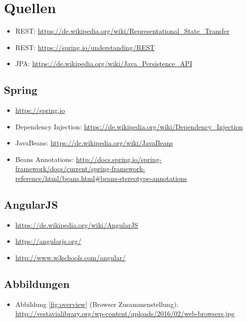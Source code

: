 \section{Quellen}

\begin{itemize}
	\item REST: \url{https://de.wikipedia.org/wiki/Representational_State_Transfer} 
	\item REST: \url{https://spring.io/understanding/REST} 
	\item JPA: \url{https://de.wikipedia.org/wiki/Java_Persistence_API} 
\end{itemize}

\subsection{Spring}

\begin{itemize}
	\item \url{https://spring.io}
	\item Dependency Injection: \url{https://de.wikipedia.org/wiki/Dependency_Injection}
	\item JavaBeans: \url{https://de.wikipedia.org/wiki/JavaBeans}
	\item Beans Annotations: \url{http://docs.spring.io/spring-framework/docs/current/spring-framework-reference/html/beans.html#beans-stereotype-annotations}
\end{itemize}

\subsection{AngularJS}

\begin{itemize}
	\item \url{https://de.wikipedia.org/wiki/AngularJS} 
	\item \url{https://angularjs.org/}
	\item \url{http://www.w3schools.com/angular/}
\end{itemize}

\subsection{Abbildungen}

\begin{itemize}
	\item Abbildung \ref{fig:overview} (Browser Zusammenstellung): \url{http://vestavialibrary.org/wp-content/uploads/2016/02/web-browsers.jpg}

\end{itemize}